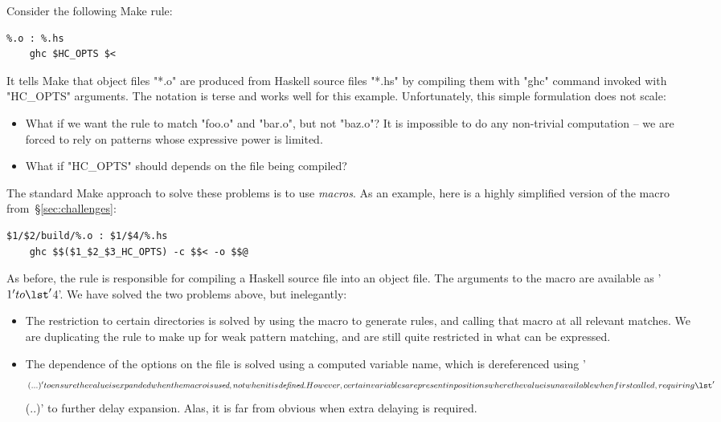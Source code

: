 Consider the following Make rule:

\begin{lstlisting}
%.o : %.hs
    ghc $HC_OPTS $<
\end{lstlisting}

\noindent It tells Make that object files \lst"*.o" are produced from Haskell
source files \lst"*.hs" by compiling them with \lst"ghc" command invoked with
\lst"HC_OPTS" arguments. The notation is terse and works well for this example.
Unfortunately, this simple formulation does not scale:

\begin{itemize}
\item What if we want the rule to match \lst"foo.o" and \lst"bar.o", but not
\lst"baz.o"? It is impossible to do any non-trivial computation -- we are forced
to rely on patterns whose expressive power is limited.
\item What if \lst"HC_OPTS" should depends on the file being compiled?
\end{itemize}

The standard Make approach to solve these problems is to use \emph{macros}.
As an example, here is a highly simplified version of the macro from~\S\ref{sec:challenges}:

\begin{lstlisting}
$1/$2/build/%.o : $1/$4/%.hs
    ghc $$($1_$2_$3_HC_OPTS) -c $$< -o $$@
\end{lstlisting}

\noindent As before, the rule is responsible for compiling a Haskell source
file into an object file. The arguments to the macro are available as \lst'$1'
to \lst'$4'. We have solved the two problems above, but inelegantly:

\begin{itemize}
\item The restriction to certain directories is solved by using the macro to
generate rules, and calling that macro at all relevant matches. We are
duplicating the rule to make up for weak pattern matching, and are still quite
restricted in what can be expressed.
\item The dependence of the options on the file is solved using a computed
variable name, which is dereferenced using \lst'$$(...)' to ensure the value is
expanded when the macro is \emph{used}, not when it is \emph{defined}. However,
certain variables are present in positions where the value is unavailable when
first called, requiring \lst'$$$$(..)' to further delay expansion. Alas, it is
far from obvious when extra delaying is required.
\end{itemize}

